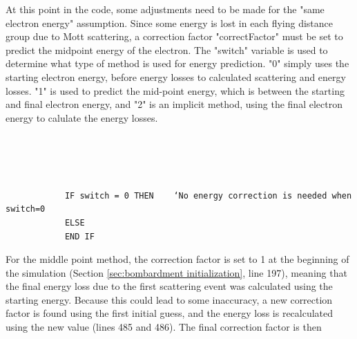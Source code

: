 \documentclass[10pt, reqno]{exam}
\begin{document}
At this point in the code, some adjustments need to be made for the "same electron energy" assumption. Since some energy is lost in each flying distance group due to Mott scattering, a correction factor "correctFactor" must be set to predict the midpoint energy of the electron. The "switch" variable is used to determine what type of method is used for energy prediction. "0" simply uses the starting electron energy, before energy losses to calculated scattering and energy losses. "1" is used to predict the mid-point energy, which is between the starting and final electron energy, and "2" is an implicit method, using the final electron energy to calulate the energy losses. \par

\begin{verbatim}

    
    
    
            IF switch = 0 THEN    ‘No energy correction is needed when switch=0
            ELSE
            END IF
\end{verbatim}
For the middle point method, the correction factor is set to 1 at the beginning of the simulation (Section \ref{sec:bombardment initialization}, line 197), meaning that the final energy loss due to the first scattering event was calculated using the starting energy. Because this could lead to some inaccuracy, a new correction factor is found using the first initial guess, and the energy loss is recalculated using the new value (lines 485 and 486). The final correction factor is then\par 
\end{document}
